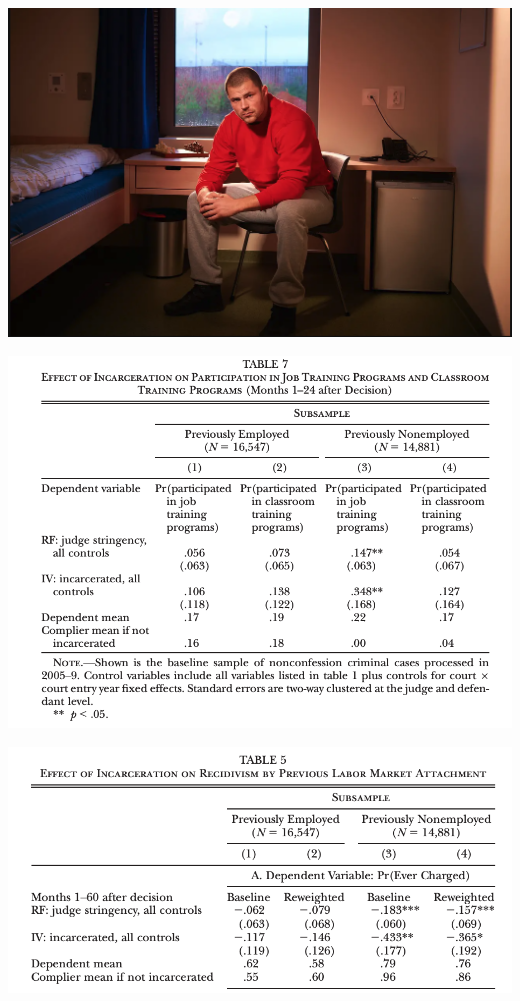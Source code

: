 \documentclass[11pt,english,handout]{beamer}
\begin{document}
\begin{frame}
	\includegraphics[width = 0.9 \linewidth]{prison-pic}
\end{frame}


\begin{frame}
	\centering
	\includegraphics[width = 0.9\linewidth]{job-training}
\end{frame}

\begin{frame}
	\centering
	\includegraphics[width = 0.9\linewidth]{incarceration-by-attachment}
\end{frame}
\end{document}
